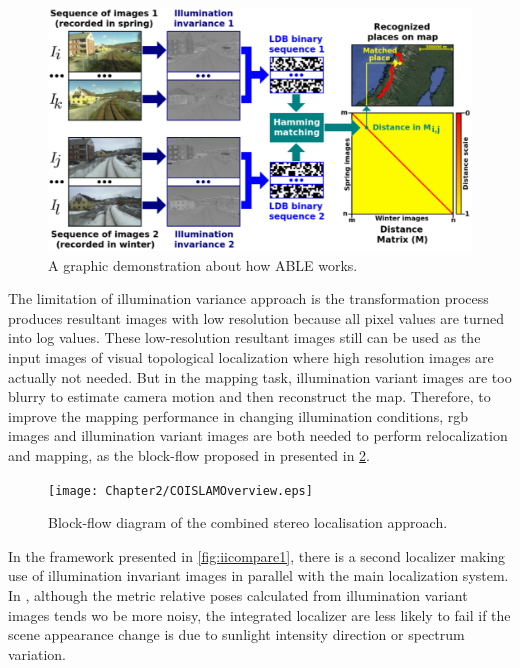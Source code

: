\begin{figure}[H]
	\centering
	\includegraphics[width=5in]{Chapter2/OPENABLEOverview.eps}
	\caption{A graphic demonstration about how ABLE works.}
	\label{fig:openableoverview} 
\end{figure}

The limitation of illumination variance approach is the transformation process produces resultant images with low resolution because all pixel values are turned into log values. These low-resolution resultant images still can be used as the input images of visual topological localization where high resolution images are actually not needed. But in the mapping task, illumination variant images are too blurry to estimate camera motion and then reconstruct the map. Therefore, to improve the mapping performance in changing illumination conditions, rgb images and illumination variant images are both needed to perform relocalization and mapping, as the block-flow proposed in \cite{mcmanus2014shady} presented in \ref{fig:iioverview}.

\begin{figure}[H]
	\centering
	\texttt{[image: Chapter2/COISLAMOverview.eps]}
	\caption{Block-flow diagram of the combined stereo localisation approach.}
	\label{fig:iioverview} 
\end{figure}

In the framework presented in \ref{fig:iicompare1}, there is a second localizer making use of illumination invariant images in parallel with the main localization system. In \cite{maddern2014illumination}, although the metric relative poses calculated from illumination variant images tends wo be more noisy, the integrated localizer are less likely to fail if the scene appearance change is due to sunlight intensity direction or spectrum variation.

\newpage
